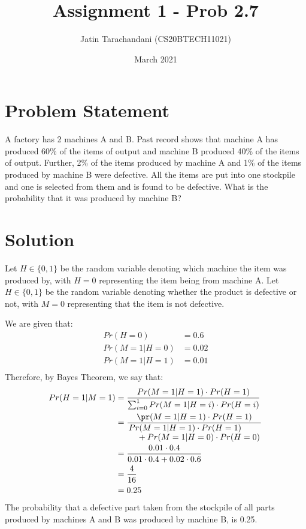 \documentclass[twocolumn]{article}
\title{Assignment 1 - Prob 2.7}
\author{Jatin Tarachandani (CS20BTECH11021)}
\date{March 2021}
\begin{document}
\maketitle

\section{Problem Statement}
A factory has 2 machines A and B. Past record shows that machine A has produced 60\% of the items of output and machine B produced 40\% of the items of output. Further, 2\% of the items produced by machine A and 1\% of the items produced by machine B were defective. All the items are put into one stockpile and one is selected from them and is found to be defective. What is the probability that it was produced by machine B? 
\section{Solution}
Let $H \in \{0,1\}$ be the random variable denoting which machine the item was produced by, with $H=0$ representing the item being from machine A. Let $H \in \{0,1\}$ be the random variable denoting whether the product is defective or not, with $M=0$ representing that the item is not defective. 

We are given that:
\begin{align*}
Pr(H=0)&=0.6\\
Pr(M=1|H=0)&=0.02\\
Pr(M=1|H=1)&=0.01\\
\end{align*}
Therefore, by Bayes Theorem, we say that:
\begin{align*}
Pr(H=1\vert M=1)&=\frac{Pr(M=1\vert H=1)\cdot Pr(H=1)}{\sum_{i=0}^{1} Pr(M=1\vert H=i)\cdot Pr(H=i)}\\
&=\frac{\pr(M=1 \vert H=1)\cdot Pr(H=1)}{\splitfrac{Pr(M=1\vert H=1)\cdot Pr(H=1)}{+Pr(M=1\vert H=0)\cdot Pr(H=0)}}\\
&=\dfrac{0.01\cdot 0.4}{0.01\cdot 0.4 + 0.02\cdot 0.6}\\
&=\dfrac{4}{16}\\
&=0.25
\end{align*}
The probability that a defective part taken from the stockpile of all parts produced by machines A and B was produced by machine B, is 0.25.
\end{document}
